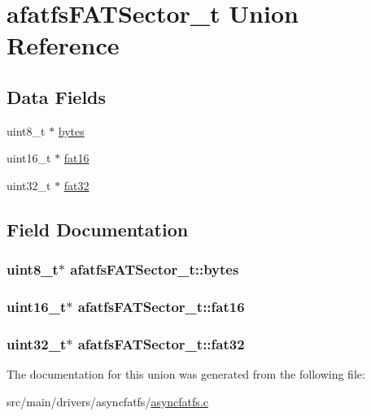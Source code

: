\hypertarget{unionafatfsFATSector__t}{\section{afatfs\+F\+A\+T\+Sector\+\_\+t Union Reference}
\label{unionafatfsFATSector__t}
}
\subsection*{Data Fields}
\begin{DoxyCompactItemize}
\item 
uint8\+\_\+t $\ast$ \hyperlink{unionafatfsFATSector__t_a20c4c4c1b029436e7a0d6d2f2e10ee20}{bytes}
\item 
uint16\+\_\+t $\ast$ \hyperlink{unionafatfsFATSector__t_a4b432ace373f4eaabb7b9cc9177b8bea}{fat16}
\item 
uint32\+\_\+t $\ast$ \hyperlink{unionafatfsFATSector__t_aed10727000f805340eec193b7d56737e}{fat32}
\end{DoxyCompactItemize}


\subsection{Field Documentation}
\hypertarget{unionafatfsFATSector__t_a20c4c4c1b029436e7a0d6d2f2e10ee20}{
\subsubsection[{bytes}]{\setlength{\rightskip}{0pt plus 5cm}uint8\+\_\+t$\ast$ afatfs\+F\+A\+T\+Sector\+\_\+t\+::bytes}}\label{unionafatfsFATSector__t_a20c4c4c1b029436e7a0d6d2f2e10ee20}
\hypertarget{unionafatfsFATSector__t_a4b432ace373f4eaabb7b9cc9177b8bea}{
\subsubsection[{fat16}]{\setlength{\rightskip}{0pt plus 5cm}uint16\+\_\+t$\ast$ afatfs\+F\+A\+T\+Sector\+\_\+t\+::fat16}}\label{unionafatfsFATSector__t_a4b432ace373f4eaabb7b9cc9177b8bea}
\hypertarget{unionafatfsFATSector__t_aed10727000f805340eec193b7d56737e}{
\subsubsection[{fat32}]{\setlength{\rightskip}{0pt plus 5cm}uint32\+\_\+t$\ast$ afatfs\+F\+A\+T\+Sector\+\_\+t\+::fat32}}\label{unionafatfsFATSector__t_aed10727000f805340eec193b7d56737e}


The documentation for this union was generated from the following file\+:\begin{DoxyCompactItemize}
\item 
src/main/drivers/asyncfatfs/\hyperlink{asyncfatfs_8c}{asyncfatfs.\+c}\end{DoxyCompactItemize}
